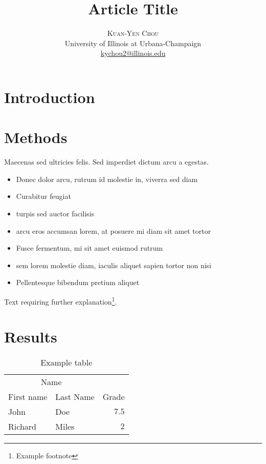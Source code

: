 \documentclass[
    10pt,
    letterpaper,
    twoside,
    twocolumn
]{article}
\title{Article Title} %
\author{
    \textsc{Kuan-Yen Chou} \\[1ex]
    \normalsize University of Illinois at Urbana-Champaign \\
    \normalsize \href{mailto:kychou2@illinois.edu}{kychou2@illinois.edu}
}
\date{}
\begin{document}
\maketitle


\section{Introduction}

\blindtext %

\blindtext %


\section{Methods}

Maecenas sed ultricies felis. Sed imperdiet dictum arcu a egestas. 
\begin{itemize}
\item Donec dolor arcu, rutrum id molestie in, viverra sed diam
\item Curabitur feugiat
\item turpis sed auctor facilisis
\item arcu eros accumsan lorem, at posuere mi diam sit amet tortor
\item Fusce fermentum, mi sit amet euismod rutrum
\item sem lorem molestie diam, iaculis aliquet sapien tortor non nisi
\item Pellentesque bibendum pretium aliquet
\end{itemize}
\blindtext %

Text requiring further explanation\footnote{Example footnote}.


\section{Results}

\begin{table}
\centering
\begin{tabular}{llr}
\toprule
    \multicolumn{2}{c}{Name} \\
\cmidrule(r){1-2}
    First name & Last Name & Grade \\
\midrule
    John & Doe & $7.5$ \\
    Richard & Miles & $2$ \\
\bottomrule
\end{tabular}
\caption{Example table}
\end{table}
\end{document}
